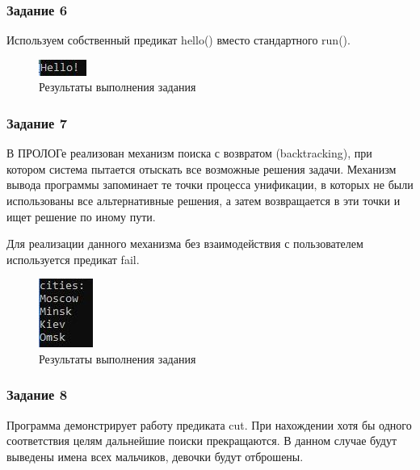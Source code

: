 \documentclass[14pt,a4paper,report]{report}
\begin{document}
\subsubsection{Задание 6}

Используем собственный предикат hello() вместо стандартного run().





\begin{figure}[h!]
	\centering
	\includegraphics[scale = 1.0]{images/d6.jpeg}
	\caption{Результаты выполнения задания}
\end{figure}

\subsubsection{Задание 7}

В ПРОЛОГе реализован механизм поиска с возвратом (backtracking), при котором система пытается отыскать все возможные решения задачи. Механизм вывода программы запоминает те точки процесса унификации, в которых не были использованы все альтернативные решения, а затем возвращается в эти точки и ищет решение по иному пути.

Для реализации данного механизма без взаимодействия с пользователем используется предикат fail. 





\begin{figure}[h!]
	\centering
	\includegraphics[scale = 1.0]{images/d7.jpeg}
	\caption{Результаты выполнения задания}
\end{figure}

\subsubsection{Задание 8}

Программа демонстрирует работу предиката cut. При нахождении хотя бы одного соответствия целям дальнейшие поиски прекращаются. В данном случае будут выведены имена всех мальчиков, девочки будут отброшены. 
\end{document}
